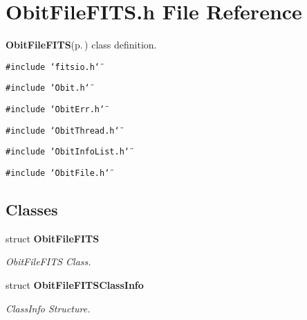 \section{Obit\-File\-FITS.h File Reference}
\label{ObitFileFITS_8h}
{\bf Obit\-File\-FITS}{\rm (p.\,\pageref{structObitFileFITS})} class definition. 

{\tt \#include \char`\"{}fitsio.h\char`\"{}}\par
{\tt \#include \char`\"{}Obit.h\char`\"{}}\par
{\tt \#include \char`\"{}Obit\-Err.h\char`\"{}}\par
{\tt \#include \char`\"{}Obit\-Thread.h\char`\"{}}\par
{\tt \#include \char`\"{}Obit\-Info\-List.h\char`\"{}}\par
{\tt \#include \char`\"{}Obit\-File.h\char`\"{}}\par
\subsection*{Classes}
\begin{CompactItemize}
\item 
struct {\bf Obit\-File\-FITS}
\begin{CompactList}\small\item\em Obit\-File\-FITS Class. \item\end{CompactList}\item 
struct {\bf Obit\-File\-FITSClass\-Info}
\begin{CompactList}\small\item\em Class\-Info Structure. \item\end{CompactList}\end{CompactItemize}
